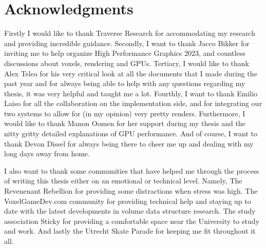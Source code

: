 \section*{Acknowledgments} \label{acknowledgments}

Firstly I would like to thank Traverse Research for accommodating my research and providing incredible guidance. Secondly, I want to thank Jacco Bikker for inviting me to help organize High Performance Graphics 2023, and countless discussions about voxels, rendering and GPUs. Tertiary, I would like to thank Alex Telea for his very critical look at all the documents that I made during the past year and for always being able to help with any questions regarding my thesis, it was very helpful and taught me a lot. Fourthly, I want to thank Emilio Laiso for all the collaboration on the implementation side, and for integrating our two systems to allow for (in my opinion) very pretty renders. Furthermore, I would like to thank Manon Oomen for her support during my thesis and the nitty gritty detailed explanations of GPU performance. And of course, I want to thank Devon Dissel for always being there to cheer me up and dealing with my long days away from home. 

I also want to thank some communities that have helped me through the process of writing this thesis either on an emotional or technical level. Namely, The Revenenant Rebellion for providing some distractions when stress was high. The VoxelGameDev.com community for providing technical help and staying up to date with the latest developments in volume data structure research. The study association Sticky for providing a comfortable space near the University to study and work. And lastly the Utrecht Skate Parade for keeping me fit throughout it all.